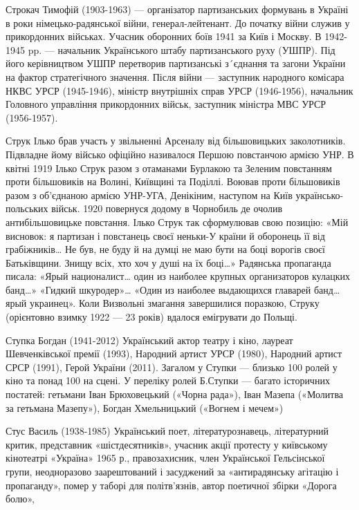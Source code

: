 Строкач Тимофій (1903-1963) --- організатор партизанських формувань в Україні в роки німецько-радянської війни, генерал-лейтенант. До початку війни служив у прикордонних військах. Учасник оборонних боїв 1941 за Київ і Москву. В 1942-1945 pp. --- начальник Українського штабу партизанського руху (УШПР). Під його керівництвом УШПР перетворив партизанські з´єднання та загони України на фактор стратегічного значення. Після війни --- заступник народного комісара НКВС УРСР (1945-1946), міністр внутрішніх справ УРСР (1946-1956), начальник Головного управління прикордонних військ, заступник міністра МВС УРСР (1956-1957).

Струк Ілько   брав участь у звільненні Арсеналу від більшовицьких заколотників. Підвладне йому військо офіційно називалося Першою повстанчою армією УНР. В квітні 1919 Ілько Струк разом з отаманами Бурлакою та Зеленим  повстанням проти більшовиків на Волині, Київщині та Поділлі.   Воював проти більшовиків разом з об'єднаною армією УНР-УГА, Денікіним, наступом на Київ українсько-польських військ. 1920 повернуся додому в Чорнобиль де очолив антибільшовицьке повстання. Ілько Струк так сформулював свою позицію: «Мій висновок: я партизан і повстанець своєї неньки-У країни й оборонець її від грабіжників… Не був, не буду й на думці не маю бути на боці ворогів своєї Батьківщини. Знищу всіх, хто хоч у душі на їх боці…»  Радянська пропаганда писала: «Ярый националист… один из наиболее крупных организаторов кулацких банд…» «Гидкий шкуродер»… «Один из наиболее выдающихся главарей банд… ярый украинец». Коли Визвольні змагання завершилися поразкою, Струку (орієнтовно взимку 1922 --- 23 років) вдалося емігрувати до Польщі. 

Ступка Богдан (1941-2012) Український актор театру і кіно, лауреат Шевченківської премії (1993), Народний артист УРСР (1980), Народний артист СРСР (1991), Герой України (2011). Загалом у Ступки --- близько 100 ролей у кіно та понад 100 на сцені. У переліку ролей Б.Ступки --- багато історичних постатей: гетьмани Іван Брюховецький («Чорна рада»), Іван Мазепа («Молитва за гетьмана Мазепу»), Богдан Хмельницький («Вогнем і мечем»)

Стус Василь (1938-1985) Український поет, літературознавець, літературний критик, представник «шістдесятників», учасник акції протесту у київському кінотеатрі «Україна» 1965 р., правозахисник, член Української Гельсінської групи, неодноразово заарештований і засуджений за «антирадянську агітацію і пропаганду», помер у таборі для політв’язнів, автор поетичної збірки «Дорога болю», 

